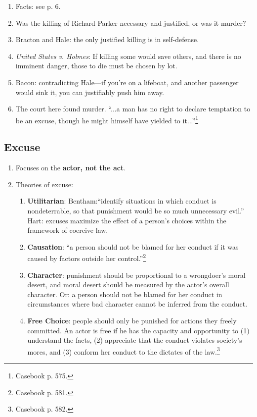 \begin{enumerate}
    \item Facts: see p. 6.
    \item Was the killing of Richard Parker necessary and justified, or was it 
    murder?
    \item Bracton and Hale: the only justified killing is in self-defense.
    \item \emph{United States v. Holmes}: If killing some would save others, 
    and there is no imminent danger, those to die must be chosen by lot.
    \item Bacon: contradicting Hale---if you're on a lifeboat, and another 
    passenger would sink it, you can justifiably push him away.
    \item The court here found murder. ``...a man has no right to declare 
    temptation to be an excuse, though he might himself have yielded to 
    it...''\footnote{Casebook p. 575.}
\end{enumerate}

\subsection{Excuse}

\begin{enumerate}
    \item Focuses on the \textbf{actor, not the act}.
    \item Theories of excuse:
    \begin{enumerate}
        \item \textbf{Utilitarian}: Bentham:``identify situations in which 
        conduct is nondeterrable, so that punishment would be so much 
        unnecessary evil.'' Hart: excuses maximize the effect of a person's 
        choices within the framework of coercive law.
        \item \textbf{Causation}: ``a person should not be blamed for her 
        conduct if it was caused by factors outside her 
        control.''\footnote{Casebook p. 581.}
        \item \textbf{Character}: punishment should be proportional to a 
        wrongdoer's moral desert, and moral desert should be measured by the 
        actor's overall character. Or: a person should not be blamed for her 
        conduct in circumstances where bad character cannot be inferred from 
        the conduct.
        \item \textbf{Free Choice}: people should only be punished for actions 
        they freely committed. An actor is free if he has the capacity and 
        opportunity to (1) understand the facts, (2) appreciate that the 
        conduct violates society's mores, and (3) conform her conduct to the 
        dictates of the law.\footnote{Casebook p. 582.}
    \end{enumerate}
\end{enumerate}

